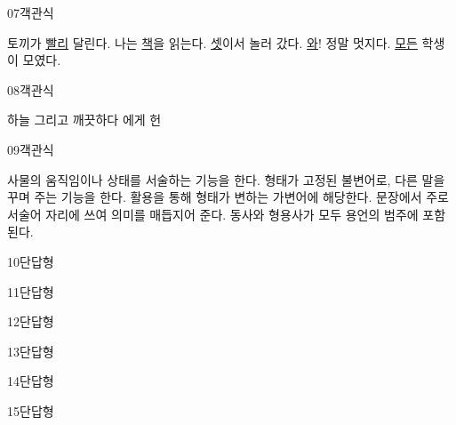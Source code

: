 \documentclass[fs85,seriesRus]{korfarm-base}
\begin{document}
\begin{kfQBlock}{07}{객관식}
\begin{kfChoices}
\kfChoice 토끼가 \uline{빨리} 달린다.
\kfChoice 나는 \uline{책}을 읽는다.
\kfChoice \uline{셋}이서 놀러 갔다.
\kfChoice \uline{와}! 정말 멋지다.
\kfChoice \uline{모든} 학생이 모였다.
\end{kfChoices}
\end{kfQBlock}
\begin{kfQBlock}{08}{객관식}
\begin{kfChoices}
\kfChoice 하늘
\kfChoice 그리고
\kfChoice 깨끗하다
\kfChoice 에게
\kfChoice 헌
\end{kfChoices}
\end{kfQBlock}
\begin{kfQBlock}{09}{객관식}
\begin{kfChoices}
\kfChoice 사물의 움직임이나 상태를 서술하는 기능을 한다.
\kfChoice 형태가 고정된 불변어로, 다른 말을 꾸며 주는 기능을 한다.
\kfChoice 활용을 통해 형태가 변하는 가변어에 해당한다.
\kfChoice 문장에서 주로 서술어 자리에 쓰여 의미를 매듭지어 준다.
\kfChoice 동사와 형용사가 모두 용언의 범주에 포함된다.
\end{kfChoices}
\end{kfQBlock}
\begin{kfQBlock}{10}{단답형}
\end{kfQBlock}
\begin{kfQBlock}{11}{단답형}
\end{kfQBlock}
\begin{kfQBlock}{12}{단답형}
\end{kfQBlock}
\begin{kfQBlock}{13}{단답형}
\end{kfQBlock}
\begin{kfQBlock}{14}{단답형}
\end{kfQBlock}
\begin{kfQBlock}{15}{단답형}
\end{kfQBlock}
\end{document}
